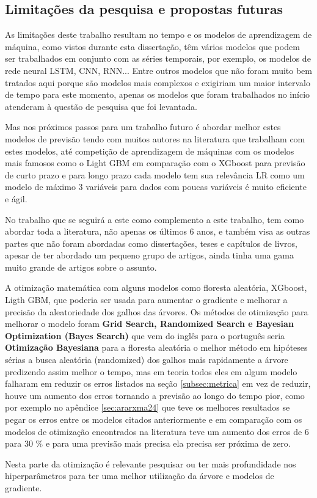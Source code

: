 \subsection{Limita\c c\~oes da pesquisa e propostas futuras}

As limitações deste trabalho resultam no tempo e os modelos de aprendizagem de máquina, como vistos durante esta dissertação, têm vários modelos que podem ser trabalhados em conjunto com as séries temporais, por exemplo, os modelos de rede neural LSTM, CNN, RNN... Entre outros modelos que não foram muito bem tratados aqui porque são modelos mais complexos e exigiriam um maior intervalo de tempo para este momento, apenas os modelos que foram trabalhados no início atenderam à questão de pesquisa que foi levantada.

Mas nos próximos passos para um trabalho futuro é abordar melhor estes modelos de previsão tendo com muitos autores na literatura que trabalham com estes modelos, até competição de aprendizagem de máquinas com os modelos mais famosos como o Light GBM em comparação com o XGboost para previsão de curto prazo e para longo prazo cada modelo tem sua relevância LR como um modelo de máximo 3 variáveis para dados com poucas variáveis é muito eficiente e ágil.

No trabalho que se seguirá a este como complemento a este trabalho, tem como abordar toda a literatura, não apenas os últimos 6 anos, e também visa as outras partes que não foram abordadas como dissertações, teses e capítulos de livros, apesar de ter abordado um pequeno grupo de artigos, ainda tinha uma gama muito grande de artigos sobre o assunto. 

A otimização matemática com alguns modelos como floresta aleatória, XGboost, Ligth GBM, que poderia ser usada para aumentar o gradiente e melhorar a precisão da aleatoriedade dos galhos das árvores. Os métodos de otimização para melhorar o modelo foram \textbf{Grid Search, Randomized Search e Bayesian Optimization (Bayes Search)} que vem do inglês para o português seria \textbf{Otimização Bayesiana} para a floresta aleatória o melhor método em hipóteses sérias a busca aleatória (randomized) dos galhos mais rapidamente a árvore predizendo assim melhor o tempo, mas em teoria todos eles em algum modelo falharam em reduzir os erros listados na seção \ref{subsec:metrica} em vez de reduzir, houve um aumento dos erros tornando a previsão ao longo do tempo pior, como por exemplo no apêndice \ref{sec:ararxma24} que teve os melhores resultados se pegar os erros entre os modelos citados anteriormente e em comparação com os modelos de otimização encontrados na literatura teve um aumento dos erros de 6 para 30 \% e para uma previsão mais precisa ela precisa ser próxima de zero.

Nesta parte da otimização é relevante pesquisar ou ter mais profundidade nos hiperparâmetros para ter uma melhor utilização da árvore e modelos de gradiente. 